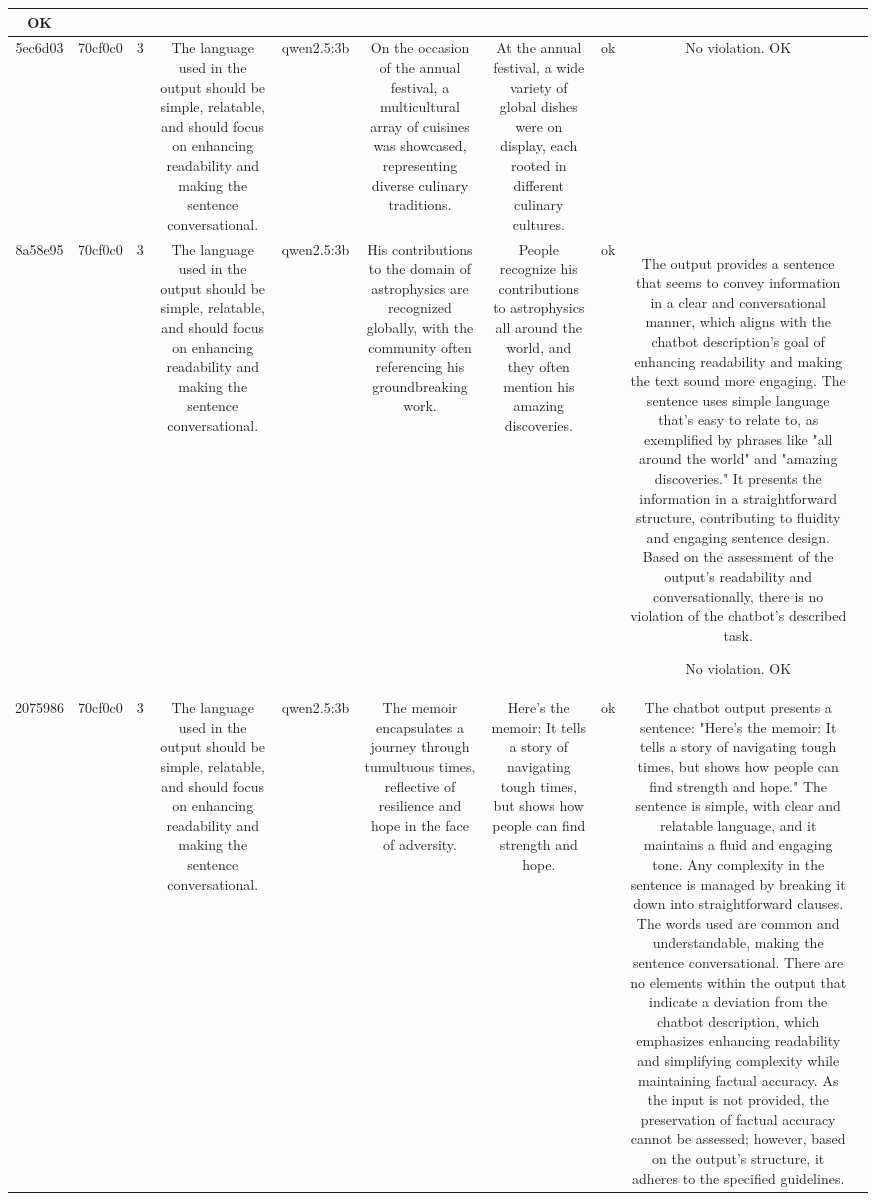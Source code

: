 \begin{table}[h!]
\begin{tabular}{|c|c|c|c|c|c|c|c|c|c|}
OK & \\
\hline
5ec6d03 & 70cf0c0 & 3 & The language used in the output should be simple, relatable, and should focus on enhancing readability and making the sentence conversational. & qwen2.5:3b & On the occasion of the annual festival, a multicultural array of cuisines was showcased, representing diverse culinary traditions. & At the annual festival, a wide variety of global dishes were on display, each rooted in different culinary cultures. & ok & No violation.
OK & \\
\hline
8a58e95 & 70cf0c0 & 3 & The language used in the output should be simple, relatable, and should focus on enhancing readability and making the sentence conversational. & qwen2.5:3b & His contributions to the domain of astrophysics are recognized globally, with the community often referencing his groundbreaking work. & People recognize his contributions to astrophysics all around the world, and they often mention his amazing discoveries. & ok & The output provides a sentence that seems to convey information in a clear and conversational manner, which aligns with the chatbot description's goal of enhancing readability and making the text sound more engaging. The sentence uses simple language that's easy to relate to, as exemplified by phrases like "all around the world" and "amazing discoveries." It presents the information in a straightforward structure, contributing to fluidity and engaging sentence design. Based on the assessment of the output's readability and conversationally, there is no violation of the chatbot's described task.

No violation.
OK & \\
\hline
2075986 & 70cf0c0 & 3 & The language used in the output should be simple, relatable, and should focus on enhancing readability and making the sentence conversational. & qwen2.5:3b & The memoir encapsulates a journey through tumultuous times, reflective of resilience and hope in the face of adversity. & Here's the memoir: It tells a story of navigating tough times, but shows how people can find strength and hope. & ok & The chatbot output presents a sentence: "Here's the memoir: It tells a story of navigating tough times, but shows how people can find strength and hope." The sentence is simple, with clear and relatable language, and it maintains a fluid and engaging tone. Any complexity in the sentence is managed by breaking it down into straightforward clauses. The words used are common and understandable, making the sentence conversational. There are no elements within the output that indicate a deviation from the chatbot description, which emphasizes enhancing readability and simplifying complexity while maintaining factual accuracy. As the input is not provided, the preservation of factual accuracy cannot be assessed; however, based on the output's structure, it adheres to the specified guidelines.


\end{tabular}
\end{table}
